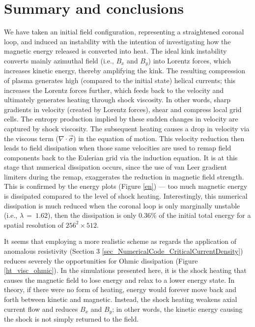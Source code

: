 \documentclass{./packages/rs/rsproca}
\begin{document}
\section{Summary and conclusions}
\label{sec_summary_conclusions}

We have taken an initial field configuration, representing a straightened coronal loop, and induced an instability with the intention of investigating how the magnetic energy released is converted into heat. The ideal kink instability converts mainly azimuthal field (i.e., $B_x$ and $B_y$) into Lorentz forces, which increases kinetic energy, thereby amplifying the kink. The resulting compression of plasma generates high (compared to the initial state) helical currents; this increases the Lorentz forces further, which feeds back to the velocity and ultimately generates heating through shock viscosity. In other words, sharp gradients in velocity (created by Lorentz forces), shear and compress local grid cells. The entropy production implied by these sudden changes in velocity are captured by shock viscosity. The subsequent heating causes a drop in velocity via the viscous term ($\nabla\cdot\vec{\sigma}$) in the equation of motion. This velocity reduction then leads to field dissipation when those same velocities are used to remap field components back to the Eulerian grid via the induction equation. It is at this stage that numerical dissipation occurs, since the use of van Leer gradient limiters during the remap, exaggerates the reduction in magnetic field strength. This is confirmed by the energy plots (Figure \ref{en}) --- too much magnetic energy is dissipated compared to the level of shock heating. Interestingly, this numerical dissipation is much reduced when the coronal loop is only marginally unstable (i.e., $\lambda\,{=}\ 1.62$), then the dissipation is only $0.36\%$ of the initial total energy for a spatial resolution of $256^2\times512$.

It seems that employing a more realistic scheme as regards the application of anomalous resistivity (Section 3 \ref{sec_NumericalCode_CriticalCurrentDensity}) reduces severely the opportunities for Ohmic dissipation (Figure \ref{ht_visc_ohmic}). In the simulations presented here, it is the shock heating that causes the magnetic field to lose energy and relax to a lower energy state. In theory, if there were no form of heating, energy would forever move back and forth between kinetic and magnetic. Instead, the shock heating weakens axial current flow and reduces $B_x$ and $B_y$; in other words, the kinetic energy causing the shock is not simply returned to the field.
\end{document}
